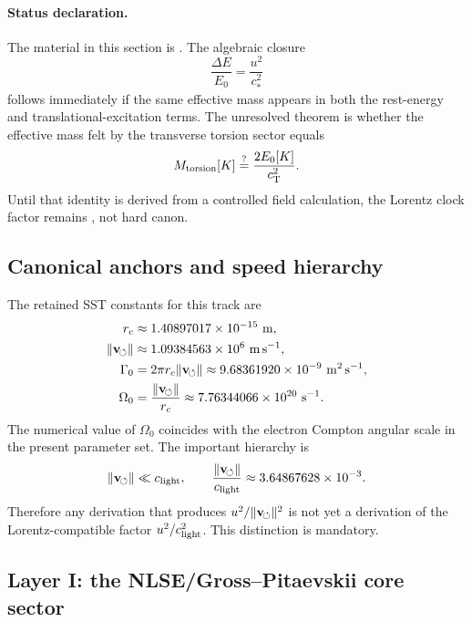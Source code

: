 \paragraph{Status declaration.}
The material in this section is .  The algebraic closure
\begin{equation}
    \frac{\Delta E}{E_0}=\frac{u^2}{c_*^2}
\end{equation}
follows immediately if the same effective mass appears in both the rest-energy and translational-excitation terms.  The unresolved theorem is whether the effective mass felt by the transverse torsion sector equals
\begin{equation}
    M_{\mathrm{torsion}}[K] \stackrel{?}{=} \frac{2E_0[K]}{c_{\mathrm{T}}^2}.
\end{equation}
Until that identity is derived from a controlled field calculation, the Lorentz clock factor remains , not hard canon.

\subsection{Canonical anchors and speed hierarchy}
\label{subsec:ctim-anchors}

The retained SST constants for this track are
\begin{align}
    \rc &\approx 1.40897017\times10^{-15}\ \mathrm{m},\\
    \lVert\vswirl\rVert &\approx 1.09384563\times10^{6}\ \mathrm{m\,s^{-1}},\\
    \GammaSST &= 2\pi \rc\lVert\vswirl\rVert
    \approx 9.68361920\times10^{-9}\ \mathrm{m^2\,s^{-1}},\\
    \Omega_0 &= \frac{\lVert\vswirl\rVert}{\rc}
    \approx 7.76344066\times10^{20}\ \mathrm{s^{-1}}.
\end{align}
The numerical value of \(\Omega_0\) coincides with the electron Compton angular scale in the present parameter set.  The important hierarchy is
\begin{equation}
    \lVert\mathbf{v}_{\!\boldsymbol{\circlearrowleft}}\rVert \ll c_{\mathrm{light}},
    \qquad
    \frac{\lVert\mathbf{v}_{\!\boldsymbol{\circlearrowleft}}\rVert}{c_{\mathrm{light}}}\approx 3.64867628\times10^{-3}.
\end{equation}
Therefore any derivation that produces \(u^2/\lVert\mathbf{v}_{\!\boldsymbol{\circlearrowleft}}\rVert^2\) is not yet a derivation of the Lorentz-compatible factor \(u^2/c_{\mathrm{light}}^2\).  This distinction is mandatory.

\subsection{Layer I: the NLSE/Gross--Pitaevskii core sector}
\label{subsec:ctim-nlse-core}

